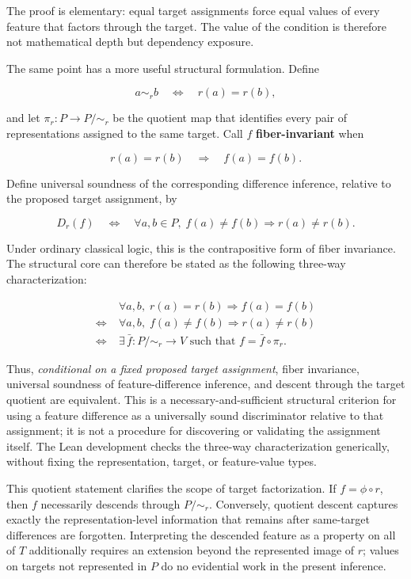 \documentclass[11pt]{article}
\begin{document}
The proof is elementary: equal target assignments force equal values of every feature that factors through the target. The value of the condition is therefore not mathematical depth but dependency exposure.

The same point has a more useful structural formulation. Define

\[
a\sim_r b
\quad\Longleftrightarrow\quad
r(a)=r(b),
\]

and let \(\pi_r:P\to P/{\sim_r}\) be the quotient map that identifies every pair of representations assigned to the same target. Call \(f\) \textbf{fiber-invariant} when

\[
r(a)=r(b)
\quad\Longrightarrow\quad
f(a)=f(b).
\]

Define universal soundness of the corresponding difference inference, relative to the proposed target assignment, by

\[
D_r(f)
\quad\Longleftrightarrow\quad
\forall a,b\in P,\;
f(a)\neq f(b)\Longrightarrow r(a)\neq r(b).
\]

Under ordinary classical logic, this is the contrapositive form of fiber invariance. The structural core can therefore be stated as the following three-way characterization:

\[
\boxed{
\begin{aligned}
&\forall a,b,\;r(a)=r(b)\Rightarrow f(a)=f(b) \\
\Longleftrightarrow\;&
\forall a,b,\;f(a)\neq f(b)\Rightarrow r(a)\neq r(b) \\
\Longleftrightarrow\;&
\exists\,\bar f:P/{\sim_r}\to V
\text{ such that }f=\bar f\circ\pi_r .
\end{aligned}
}
\]

Thus, \emph{conditional on a fixed proposed target assignment}, fiber invariance, universal soundness of feature-difference inference, and descent through the target quotient are equivalent. This is a necessary-and-sufficient structural criterion for using a feature difference as a universally sound discriminator relative to that assignment; it is not a procedure for discovering or validating the assignment itself. The Lean development checks the three-way characterization generically, without fixing the representation, target, or feature-value types.

This quotient statement clarifies the scope of target factorization. If \(f=\phi\circ r\), then \(f\) necessarily descends through \(P/{\sim_r}\). Conversely, quotient descent captures exactly the representation-level information that remains after same-target differences are forgotten. Interpreting the descended feature as a property on all of \(T\) additionally requires an extension beyond the represented image of \(r\); values on targets not represented in \(P\) do no evidential work in the present inference.
\end{document}
